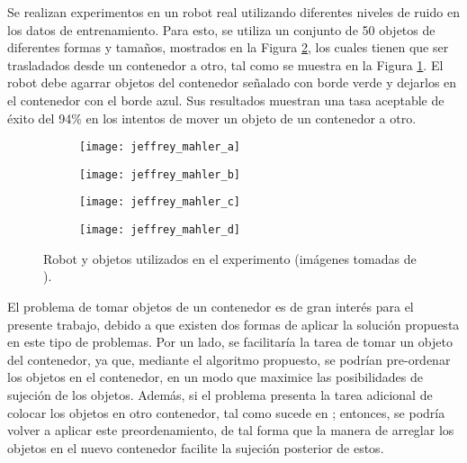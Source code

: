 Se realizan experimentos en un robot real utilizando diferentes niveles de ruido en los datos de entrenamiento.
Para esto, se utiliza un conjunto de 50 objetos de diferentes formas y tamaños, mostrados en la Figura \ref{subfig:fifty_objects}, los cuales tienen que ser trasladados desde un contenedor a otro, tal como se muestra en la Figura \ref{subfig:object_picking}.
El robot debe agarrar objetos del contenedor señalado con borde verde y dejarlos en el contenedor con el borde azul.
Sus resultados muestran una tasa aceptable de éxito del 94\!\% en los intentos de mover un objeto de un contenedor a otro.
%
\begin{figure}[H]
	\begin{subfigure}[t]{0.275\linewidth}
		\texttt{[image: jeffrey\_mahler\_a]}%
		\subcaption{}%
		\label{subfig:object_picking}%
	\end{subfigure}%
	\hspace{10pt}%
	\begin{subfigure}[t]{0.45\linewidth}
		\texttt{[image: jeffrey\_mahler\_b]}%
		\subcaption{}%
		\label{subfig:fifty_objects}%
	\end{subfigure}%
	\begin{minipage}[b][4cm]{3.2cm}%
	\begin{subfigure}[t]{\linewidth}
		\texttt{[image: jeffrey\_mahler\_c]}%
	\end{subfigure}%
	\vfill%
	\begin{subfigure}[t]{\linewidth}
		\texttt{[image: jeffrey\_mahler\_d]}%
		\subcaption{}%
		\label{subfig:depth_image}%
	\end{subfigure}%
	\end{minipage}%
	\caption{Robot y objetos utilizados en el experimento (imágenes tomadas de \cite{pmlr-v78-mahler17a}).}%
	\label{fig:pmlr-v78-mahler17a}%
\end{figure}
%
El problema de tomar objetos de un contenedor es de gran interés para el presente trabajo, debido a que existen dos formas de aplicar la solución propuesta en este tipo de problemas.
Por un lado, se facilitaría la tarea de tomar un objeto del contenedor, ya que, mediante el algoritmo propuesto, se podrían pre-ordenar los objetos en el contenedor, en un modo que maximice las posibilidades de sujeción de los objetos.
Además, si el problema presenta la tarea adicional de colocar los objetos en otro contenedor, tal como sucede en \cite{8793966}; entonces, se podría volver a aplicar este preordenamiento, de tal forma que la manera de arreglar los objetos en el nuevo contenedor facilite la sujeción posterior de estos.

